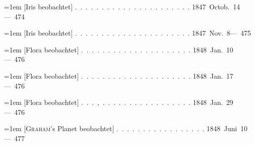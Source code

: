 \noindent\hangindent=1em [Iris beobachtet] \mbox{.\ .\ .\ .\ .\ .\ .\ .\ .\ .\ .\ .\ .\ .\ .\ .\ .\ .\ .\ .\ .\ .} \hfill\mbox{1847 Octob. 14}\quad\mbox{--- 474}\par\smallskip
\noindent\hangindent=1em [Iris beobachtet] \mbox{.\ .\ .\ .\ .\ .\ .\ .\ .\ .\ .\ .\ .\ .\ .\ .\ .\ .\ .\ .\ .\ .} \hfill\mbox{1847 Nov. 8}\quad\mbox{--- 475}\par\smallskip
\noindent\hangindent=1em [Flora beobachtet] \mbox{.\ .\ .\ .\ .\ .\ .\ .\ .\ .\ .\ .\ .\ .\ .\ .\ .\ .\ .\ .\ .} \hfill\mbox{1848 Jan. 10}\quad\mbox{--- 476}\par\smallskip
\noindent\hangindent=1em [Flora beobachtet] \mbox{.\ .\ .\ .\ .\ .\ .\ .\ .\ .\ .\ .\ .\ .\ .\ .\ .\ .\ .\ .\ .} \hfill\mbox{1848 Jan. 17}\quad\mbox{--- 476}\par\smallskip
\noindent\hangindent=1em [Flora beobachtet] \mbox{.\ .\ .\ ,\ .\ .\ .\ .\ .\ .\ .\ .\ .\ .\ .\ .\ .\ .\ .\ .\ .} \hfill\mbox{1848 Jan. 29}\quad\mbox{--- 476}\par\smallskip
\noindent\hangindent=1em [\textsc{Graham}'s Planet beobachtet] \mbox{.\ .\ .\ .\ .\ .\ .\ .\ .\ .\ .\ .\ .\ .\ .\ .\ .} \hfill\mbox{1848 Juni 10}\quad\mbox{--- 477}\par\smallskip
\endgroup
